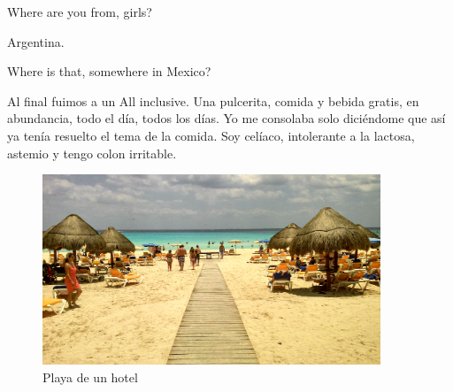 \documentclass[11pt,twoside,openright,a6paper]{book}
\begin{document}
\vspace{0.5cm}
\hrulefill\hspace{0.2cm} \decofourleft\decofourright \hspace{0.2cm} \hrulefill
\vspace{0.5cm}

Where are you from, girls?

Argentina.

Where is that, somewhere in Mexico?


\vspace{0.5cm}
\hrulefill\hspace{0.2cm} \decofourleft\decofourright \hspace{0.2cm} \hrulefill
\vspace{0.5cm}

Al final fuimos a un All inclusive. Una pulcerita, comida y bebida gratis, en
abundancia, todo el día, todos los días. Yo me consolaba solo diciéndome
que así ya tenía resuelto el tema de la comida. Soy celíaco, intolerante
a la lactosa, astemio y tengo colon irritable.

\begin{figure}[H]
  \centering
    \includegraphics[width=0.9\textwidth]{fotos/2013/hotel}
  \caption{Playa de un hotel}
  \label{Playa de un hotel}
\end{figure}


\vspace{0.5cm}
\hrulefill\hspace{0.2cm} \decofourleft\decofourright \hspace{0.2cm} \hrulefill
\vspace{0.5cm}
\end{document}
